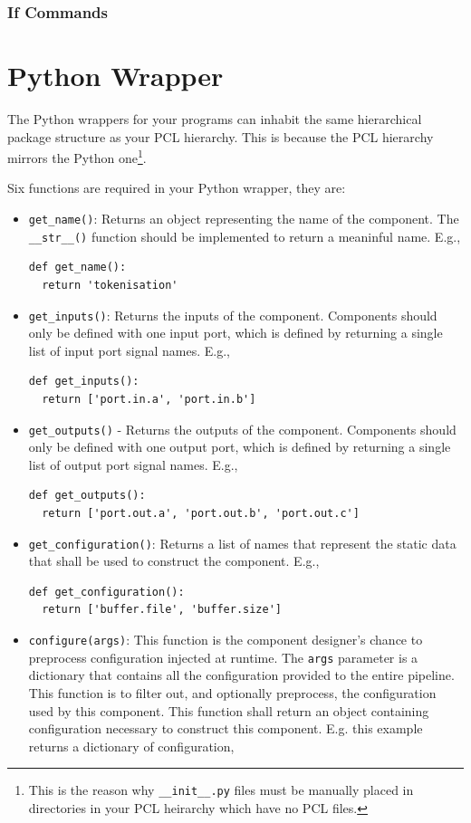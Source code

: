 \subsubsection{If Commands}

\section{Python Wrapper}
The Python wrappers for your programs can inhabit the same hierarchical package structure as your PCL hierarchy. This is because the PCL hierarchy mirrors the Python one\footnote{This is the reason why \texttt{\_\_init\_\_.py} files must be manually placed in directories in your PCL heirarchy which have no PCL files.}.

Six functions are required in your Python wrapper, they are:
\begin{itemize}
\item \texttt{get\_name()}: Returns an object representing the name of the component. The \texttt{\_\_str\_\_()} function should be implemented to return a meaninful name. E.g.,
\begin{verbatim}
def get_name():
  return 'tokenisation'
\end{verbatim}
\item \texttt{get\_inputs()}: Returns the inputs of the component. Components should only be defined with one input port, which is defined by returning a single list of input port signal names. E.g.,
\begin{verbatim}
def get_inputs():
  return ['port.in.a', 'port.in.b']
\end{verbatim}
\item \texttt{get\_outputs()} - Returns the outputs of the component. Components should only be defined with one output port, which is defined by returning a single list of output port signal names. E.g.,
\begin{verbatim}
def get_outputs():
  return ['port.out.a', 'port.out.b', 'port.out.c']
\end{verbatim}
\item \texttt{get\_configuration()}: Returns a list of names that represent the static data that shall be used to construct the component. E.g.,
\begin{verbatim}
def get_configuration():
  return ['buffer.file', 'buffer.size']
\end{verbatim}
\item \texttt{configure(args)}: This function is the component designer's chance to preprocess configuration injected at runtime. The \texttt{args} parameter is a dictionary that contains all the configuration provided to the entire pipeline. This function is to filter out, and optionally preprocess, the configuration used by this component. This function shall return an object containing configuration necessary to construct this component. E.g. this example returns a dictionary of configuration,

\end{itemize}
